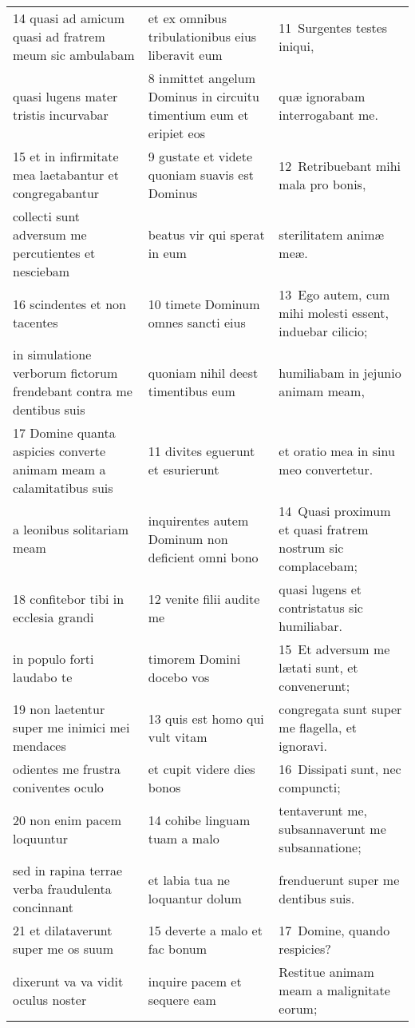 \documentclass{article}
\begin{document}
\begin{longtable}{@{}p{}p{}p{}@{}}
14 quasi ad amicum quasi ad fratrem meum sic ambulabam	&	et ex omnibus tribulationibus eius liberavit eum	&	11 Surgentes testes iniqui,	\\
quasi lugens mater tristis incurvabar	&	8 inmittet angelum Dominus in circuitu timentium eum et eripiet eos	&	quæ ignorabam interrogabant me.	\\
15 et in infirmitate mea laetabantur et congregabantur	&	9 gustate et videte quoniam suavis est Dominus	&	12 Retribuebant mihi mala pro bonis,	\\
collecti sunt adversum me percutientes et nesciebam	&	beatus vir qui sperat in eum	&	sterilitatem animæ meæ.	\\
16 scindentes et non tacentes	&	10 timete Dominum omnes sancti eius	&	13 Ego autem, cum mihi molesti essent, induebar cilicio;	\\
in simulatione verborum fictorum frendebant contra me dentibus suis	&	quoniam nihil deest timentibus eum	&	humiliabam in jejunio animam meam,	\\
17 Domine quanta aspicies converte animam meam a calamitatibus suis	&	11 divites eguerunt et esurierunt	&	et oratio mea in sinu meo convertetur.	\\
a leonibus solitariam meam	&	inquirentes autem Dominum non deficient omni bono	&	14 Quasi proximum et quasi fratrem nostrum sic complacebam;	\\
18 confitebor tibi in ecclesia grandi	&	12 venite filii audite me	&	quasi lugens et contristatus sic humiliabar.	\\
in populo forti laudabo te	&	timorem Domini docebo vos	&	15 Et adversum me lætati sunt, et convenerunt;	\\
19 non laetentur super me inimici mei mendaces	&	13 quis est homo qui vult vitam	&	congregata sunt super me flagella, et ignoravi.	\\
odientes me frustra coniventes oculo	&	et cupit videre dies bonos	&	16 Dissipati sunt, nec compuncti;	\\
20 non enim pacem loquuntur	&	14 cohibe linguam tuam a malo	&	tentaverunt me, subsannaverunt me subsannatione;	\\
sed in rapina terrae verba fraudulenta concinnant	&	et labia tua ne loquantur dolum	&	frenduerunt super me dentibus suis.	\\
21 et dilataverunt super me os suum	&	15 deverte a malo et fac bonum	&	17 Domine, quando respicies?	\\
dixerunt va va vidit oculus noster	&	inquire pacem et sequere eam	&	Restitue animam meam a malignitate eorum;	\\

\end{longtable}
\end{document}
